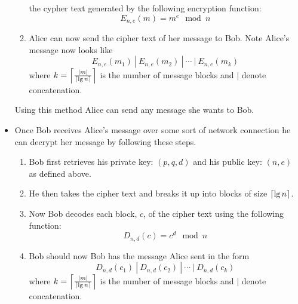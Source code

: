 \begin{definition}
\begin{itemize}
\begin{enumerate}
                            the cypher text generated by the following encryption function:
                            \begin{equation}
                                E_{n, e}(m) = m^e \mod n
                            \end{equation}
                        \item
                            Alice can now send the cipher text of her message to Bob. Note Alice's
                            message now looks like
                            \[
                                E_{n, e}(m_1) \ | \ E_{n, e}(m_2) \ | \ \cdots \ | \ E_{n, e}(m_k)
                            \]
                            where $k = \left\lceil \frac{\left|m\right|}{\left\lceil \lg n \right\rceil} \right\rceil$ is the number of message blocks
                            and $|$ denote concatenation.
                    \end{enumerate}
                    Using this method Alice can send any message she wants to Bob.
                \item
                    Once Bob receives Alice's message over some sort of network connection
                    he can decrypt her message by following these steps.
                    \begin{enumerate}
                        \item
                            Bob first retrieves his private key: $(p, q, d)$ and his public key: $(n, e)$
                            as defined above.
                        \item   
                            He then takes the cipher text and breaks it up into blocks of size $\left\lceil \lg n \right\rceil$. 
                        \item
                            Now Bob decodes each block, $c$, of the cipher text using the following
                            function:
                            \[
                                D_{n, d}(c) = c^d \mod n
                            \]
                        \item
                            Bob should now Bob has the message Alice sent in the form
                            \[
                                D_{n, d}(c_1) \ | \ D_{n, d}(c_2) \ | \ \cdots \ | \ D_{n, d}(c_k)
                            \]
                            where $k = \left\lceil \frac{\left|m\right|}{\left\lceil \lg n \right\rceil} \right\rceil$ is the number of message blocks
                            and $|$ denote concatenation.
                    \end{enumerate}

\end{itemize}
\end{definition}
